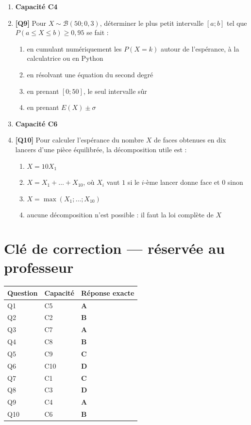 \begin{enumerate}
\item[] \textbf{Capacité C4}

\item \textbf{[Q9]} Pour $X\sim\mathcal B(50;0{,}3)$, déterminer le plus petit intervalle $[a;b]$ tel que $P(a\leq X\leq b)\geq0{,}95$ se fait :
  \begin{enumerate}[label=\Alph*.]
    \item en cumulant numériquement les $P(X=k)$ autour de l'espérance, à la calculatrice ou en Python
    \item en résolvant une équation du second degré
    \item en prenant $[0;50]$, le seul intervalle sûr
    \item en prenant $E(X)\pm\sigma$
  \end{enumerate}

\item[] \textbf{Capacité C6}

\item \textbf{[Q10]} Pour calculer l'espérance du nombre $X$ de faces obtenues en dix lancers d'une pièce équilibrée, la décomposition utile est :
  \begin{enumerate}[label=\Alph*.]
    \item $X=10X_1$
    \item $X=X_1+\dots+X_{10}$, où $X_i$ vaut $1$ si le $i$-ème lancer donne face et $0$ sinon
    \item $X=\max(X_1;\dots;X_{10})$
    \item aucune décomposition n'est possible : il faut la loi complète de $X$
  \end{enumerate}

\end{enumerate}

\ifnxVersionProfesseur
\clearpage
\section*{Clé de correction — réservée au professeur}

\begin{center}
\begin{tabular}{lll}
\hline
Question & Capacité & Réponse exacte \\
\hline
Q1 & C5 & \textbf{A} \\
Q2 & C2 & \textbf{B} \\
Q3 & C7 & \textbf{A} \\
Q4 & C8 & \textbf{B} \\
Q5 & C9 & \textbf{C} \\
Q6 & C10 & \textbf{D} \\
Q7 & C1 & \textbf{C} \\
Q8 & C3 & \textbf{D} \\
Q9 & C4 & \textbf{A} \\
Q10 & C6 & \textbf{B} \\
\hline
\end{tabular}
\end{center}

